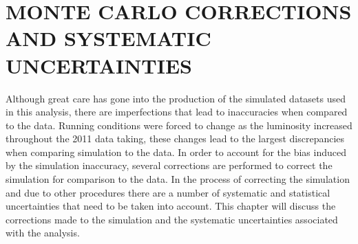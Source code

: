 \chapter{MONTE CARLO CORRECTIONS AND SYSTEMATIC UNCERTAINTIES}
\label{chap:systematics}
Although great care has gone into the production of the simulated datasets used in this analysis, there are imperfections that lead to inaccuracies when compared to the data.
Running conditions were forced to change as the luminosity increased throughout the 2011 data taking, these changes lead to the largest discrepancies when comparing simulation to the data.
In order to account for the bias induced by the simulation inaccuracy, several corrections are performed to correct the simulation for comparison to the data.
In the process of correcting the simulation and due to other procedures there are a number of systematic and statistical uncertainties that need to be taken into account.
This chapter will discuss the corrections made to the simulation and the systematic uncertainties associated with the analysis.




